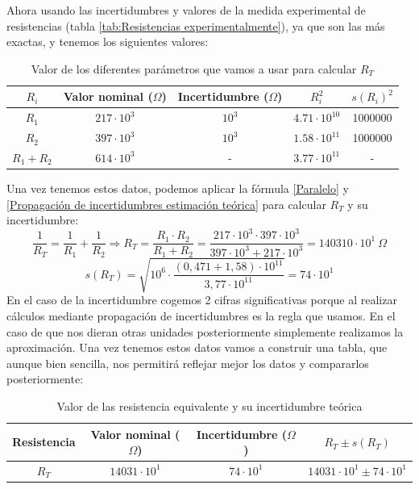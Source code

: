 \documentclass[10pt,a4paper]{article}
\begin{document}
Ahora usando las incertidumbres y valores de la medida experimental de resistencias (tabla \ref{tab:Resistencias experimentalmente}), ya que son las más exactas, y tenemos los siguientes valores:

\begin{table}[h] %
\begin{center}
\begin{tabular}{| c | c | c | c | c |}
\hline

$R_i$ & Valor nominal ($\Omega$) & Incertidumbre ($\Omega$) & $R_i^2$ & $s(R_i)^2$ \\ \hline
$R_1$ & $217 \cdot 10^3$ & $10^3$ & $4.71 \cdot 10^{10}$ & 1000000 \\
$R_2$ & $397\cdot 10^3$ & $10^3$ & $1.58 \cdot 10^{11}$  & 1000000 \\ 
$R_1+R_2$ & $614\cdot 10^3$ & - & $3.77 \cdot 10^{11} $ & -\\ \hline
\end{tabular}
\caption{Valor de los diferentes parámetros que vamos a usar para calcular $R_T$ }
\end{center}
\end{table}

Una vez tenemos estos datos, podemos aplicar la fórmula \ref{Paralelo} y \ref{Propagación de incertidumbres estimación teórica} para calcular $R_T$ y su incertidumbre:
$$ \dfrac{1}{R_T}=\dfrac{1}{R_1}+\dfrac{1}{R_2} \Longrightarrow R_T=\dfrac{R_1 \cdot R_2}{R_1+R_2}=\dfrac{217 \cdot 10^3 \cdot 397\cdot 10^3}{397\cdot 10^3 + 217 \cdot 10^3}=140310 \cdot 10^1\ \Omega $$
$$ s(R_T)=\sqrt{10^6 \cdot \dfrac{(0,471+1,58)\cdot10^{11}}{3,77 \cdot 10^{11}}} =74 \cdot 10^1 $$
En el caso de la incertidumbre cogemos 2 cifras significativas porque al realizar cálculos mediante propagación de incertidumbres es la regla que usamos. En el caso de que nos dieran otras unidades posteriormente simplemente realizamos la aproximación. Una vez tenemos estos datos vamos a construir una tabla, que aunque bien sencilla, nos permitirá reflejar mejor los datos y compararlos posteriormente:


\begin{table}[h] %
\begin{center}
\begin{tabular}{| c | c | c | c | }
\hline

Resistencia & Valor nominal ($\Omega$) & Incertidumbre ($\Omega$) & $R_T \pm s(R_T)$\\ \hline
$R_T$ & $14031 \cdot 10^1 $ & $74 \cdot 10^1 $ & $14031 \cdot 10^1 \pm 74 \cdot 10^1$ \\ \hline
\end{tabular}
\caption{ Valor de las resistencia equivalente y su incertidumbre teórica}
\end{center}
\end{table}
\end{document}
